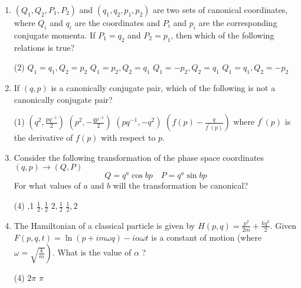 \begin{enumerate}
\begin{tasks}
	\end{tasks}
	\item  $\left(Q_{1}, Q_{2}, P_{1}, P_{2}\right)$ and $\left(q_{1}, q_{2}, p_{1}, p_{2}\right)$ are two sets of canonical coordinates, where $Q_{i}$ and $q_{i}$ are the coordinates and $P_{i}$ and $p_{i}$ are the corresponding conjugate momenta. If $P_{1}=q_{2}$ and $P_{2}=p_{1}$, then which of the following relations is true?
	{}
	 \begin{tasks}(2)
		\task[\textbf{a.}]$Q_{1}=q_{1}, Q_{2}=p_{2}$
		\task[\textbf{b.}]$Q_{1}=p_{2}, Q_{2}=q_{1}$
		\task[\textbf{c.}]$Q_{1}=-p_{2}, Q_{2}=q_{1}$
		\task[\textbf{d.}] $Q_{1}=q_{1}, Q_{2}=-p_{2}$
	\end{tasks}
	\item  If $(q, p)$ is a canonically conjugate pair, which of the following is not a canonically conjugate pair?
{}
	 \begin{tasks}(1)
		\task[\textbf{a.}] $\left(q^{2}, \frac{p q^{-1}}{2}\right)$
		\task[\textbf{b.}]$\left(p^{2},-\frac{q p^{-1}}{2}\right)$
		\task[\textbf{c.}] $\left(p q^{-1},-q^{2}\right)$
		\task[\textbf{d.}] $\left(f(p)-\frac{q}{f^{\prime}(p)}\right)$ where $f^{\prime}(p)$ is the derivative of $f(p)$ with respect to $p$.
	\end{tasks}
	\item  Consider the following transformation of the phase space coordinates $(q, p) \rightarrow(Q, P)$
	$$
	Q=q^{a} \cos b p \quad P=q^{a} \sin b p
	$$
	For what values of $a$ and $b$ will the transformation be canonical?
{}
	 \begin{tasks}(4)
		,1
		\task[\textbf{b.}] $\frac{1}{2}, \frac{1}{2}$
		\task[\textbf{c.}]$2, \frac{1}{2}$
		\task[\textbf{d.}] $\frac{1}{2}, 2$
	\end{tasks}
	\item  The Hamiltonian of a classical particle is given by $H(p, q)=\frac{p^{2}}{2 m}+\frac{k q^{2}}{2}$. Given $F(p, q, t)=\ln (p+i m \omega q)-i \alpha \omega t$ is a constant of motion (where $\left.\omega=\sqrt{\frac{k}{m}}\right)$. What is the value of $\alpha$ ?
{}
	 \begin{tasks}(4)
		\task[\textbf{a.}]$2 \pi$
		\task[\textbf{d.}]  $\pi$
	\end{tasks}
\end{enumerate}
\setlength\arrayrulewidth{1pt}
